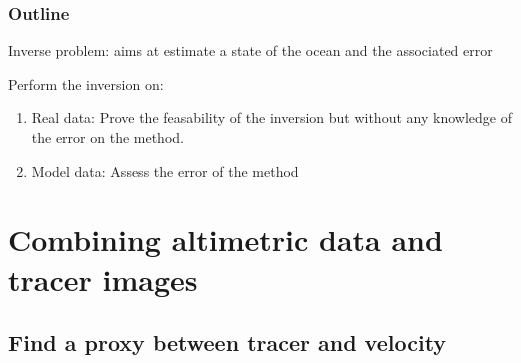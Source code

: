 \documentclass[compress,slidescentered,notes=hide]{beamer}
\begin{document}
\begin{frame}
  \frametitle{Outline}

  \begin{block}{}
    Inverse problem: aims at estimate a state of the ocean and the associated error
  \end{block}
 
  \begin{block}{Perform the inversion on:}
  \begin{enumerate}
    \item Real data: Prove the feasability of the inversion but without any knowledge of the error on the method. 
    \item Model data: Assess the error of the method
  \end{enumerate}
  \end{block}
\end{frame}

\section[Method]{Combining altimetric data and tracer images}

\subsection[proxy FSLE]{Find a proxy between tracer and velocity}
\end{document}
